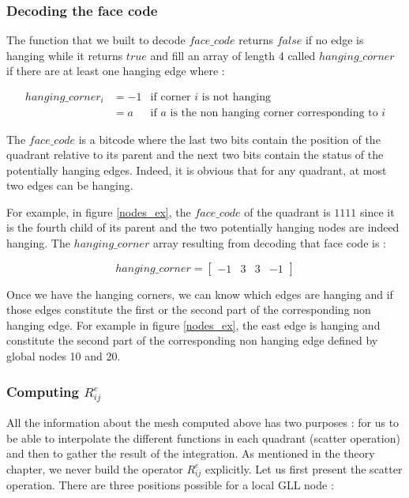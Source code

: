 \subsubsection{Decoding the face code}

The function that we built to decode $face\_code$ returns $false$ if no edge is hanging while it returns $true$ and fill an array of length 4 called $hanging\_corner$ if there are at least one hanging edge where : 

\begin{align*}
hanging\_corner_i &= -1 &\text{if corner $i$ is not hanging}\\
&= a &\text{if $a$ is the non hanging corner corresponding to $i$}
\end{align*}

The $face\_code$ is a bitcode where the last two bits contain the position of the quadrant relative to its parent and the next two bits contain the status of the potentially hanging edges. Indeed, it is obvious that for any quadrant, at most two edges can be hanging. 

For example, in figure \ref{nodes_ex}, the $face\_code$ of the quadrant is $1111$ since it is the fourth child of its parent and the two potentially hanging nodes are indeed hanging. The $hanging\_corner$ array resulting from decoding that face code is : 

$$hanging\_corner = \begin{bmatrix}
-1 &3& 3& -1
\end{bmatrix}$$

Once we have the hanging corners, we can know which edges are hanging and if those edges constitute the first or the second part of the corresponding non hanging edge. For example in figure \ref{nodes_ex}, the east edge is hanging and constitute the second part of the corresponding non hanging edge defined by global nodes 10 and 20. 

\subsubsection{Computing $R_{ij}^e$}

All the information about the mesh computed above has two purposes : for us to be able to interpolate the different functions in each quadrant (scatter operation) and then to gather the result of the integration. As mentioned in the theory chapter, we never build the operator $R_{ij}^e$ explicitly. Let us first present the scatter operation. There are three positions possible for a local GLL node : 

